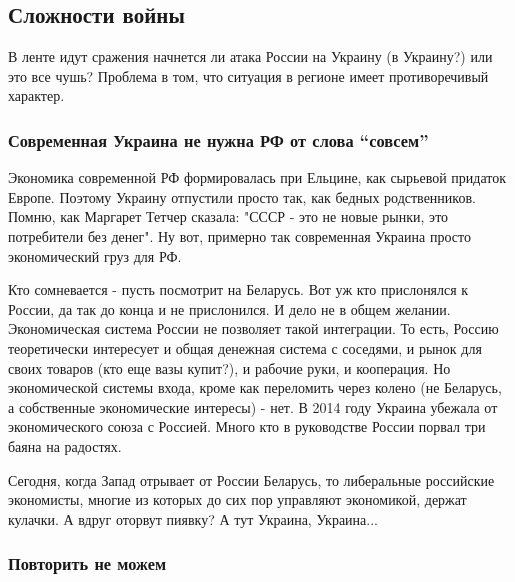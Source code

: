  
 
 
 
 

\subsection{Сложности войны}

В ленте идут сражения начнется ли атака России на Украину (в Украину?) или это
все чушь? Проблема в том, что ситуация в регионе имеет противоречивый характер.

\subsubsection{Современная Украина не нужна РФ от слова \enquote{совсем}}

Экономика современной РФ формировалась при Ельцине, как сырьевой придаток
Европе. Поэтому Украину отпустили просто так, как бедных родственников. Помню,
как Маргарет Тетчер сказала: "СССР - это не новые рынки, это потребители без
денег". Ну вот, примерно так современная Украина просто экономический груз для
РФ. 

Кто сомневается - пусть посмотрит на Беларусь. Вот уж кто прислонялся к России,
да так до конца и не прислонился. И дело не в общем желании. Экономическая
система России не позволяет такой интеграции. То есть, Россию теоретически
интересует и общая денежная система с соседями, и рынок для своих товаров (кто
еще вазы купит?), и рабочие руки, и кооперация. Но экономической системы входа,
кроме как переломить через колено (не Беларусь, а собственные экономические
интересы) - нет. В 2014 году Украина убежала от экономического союза с Россией.
Много кто в руководстве России порвал три баяна на радостях. 

Сегодня, когда Запад отрывает от России Беларусь, то либеральные российские
экономисты, многие из которых до сих пор управляют экономикой, держат кулачки.
А вдруг оторвут пиявку? А тут Украина, Украина... 

\subsubsection{Повторить не можем}

